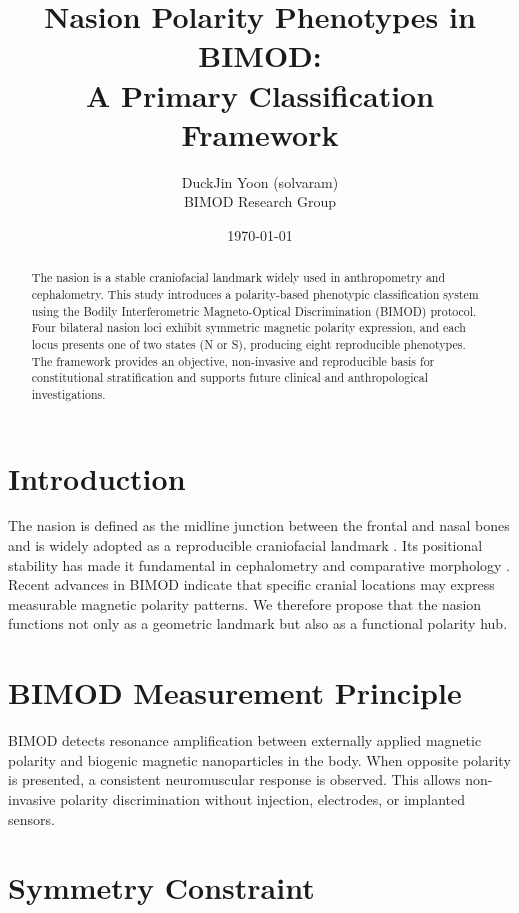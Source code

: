 \documentclass[11pt,a4paper]{article}
\title{Nasion Polarity Phenotypes in BIMOD:\\
A Primary Classification Framework}
\author{
DuckJin Yoon (solvaram)\\
BIMOD Research Group
}
\date{\today}
\begin{document}
\maketitle

\begin{abstract}
The nasion is a stable craniofacial landmark widely used in anthropometry and cephalometry.
This study introduces a polarity-based phenotypic classification system using the Bodily
Interferometric Magneto-Optical Discrimination (BIMOD) protocol. Four bilateral nasion loci
exhibit symmetric magnetic polarity expression, and each locus presents one of two states
(N or S), producing eight reproducible phenotypes. The framework provides an objective,
non-invasive and reproducible basis for constitutional stratification and supports future
clinical and anthropological investigations.
\end{abstract}

\section{Introduction}

The nasion is defined as the midline junction between the frontal and nasal bones and is
widely adopted as a reproducible craniofacial landmark \cite{nasion_wikipedia}.
Its positional stability has made it fundamental in cephalometry and comparative morphology
\cite{hegde2013nasion_orbitale}. Recent advances in BIMOD indicate that specific cranial
locations may express measurable magnetic polarity patterns. We therefore propose that the
nasion functions not only as a geometric landmark but also as a functional polarity hub.

\section{BIMOD Measurement Principle}

BIMOD detects resonance amplification between externally applied magnetic polarity and
biogenic magnetic nanoparticles in the body. When opposite polarity is presented, a consistent
neuromuscular response is observed. This allows non-invasive polarity discrimination without
injection, electrodes, or implanted sensors.

\section{Symmetry Constraint}
\end{document}

